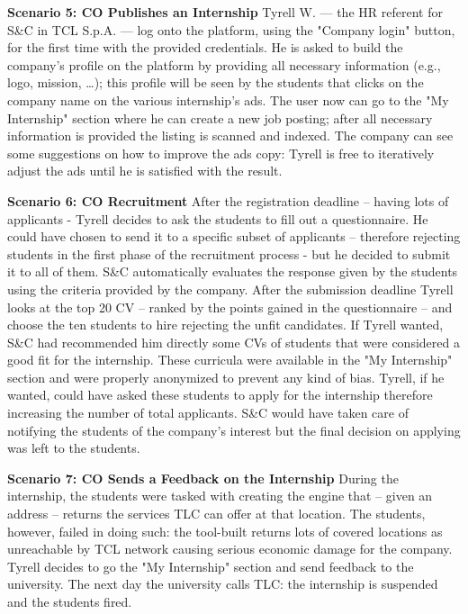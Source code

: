 \par{\textbf{Scenario 5: CO Publishes an Internship}} Tyrell W. — the HR referent for S\&C in TCL S.p.A. — log onto the
platform, using the "Company login" button, for the first time with the provided credentials. He is asked to build the
company’s profile on the platform by providing all necessary information (e.g., logo, mission, …); this profile will be
seen by the students that clicks on the company name on the various internship’s ads. The user now can go to the
"My Internship" section where he can create a new job posting; after all necessary information is provided the listing
is scanned and indexed. The company can see some suggestions on how to improve the ads copy: Tyrell is free to
iteratively adjust the ads until he is satisfied with the result.

\par{\textbf{Scenario 6: CO Recruitment}} After the registration deadline – having lots of applicants - Tyrell decides
to ask the students to fill out a questionnaire. He could have chosen to send it to a specific subset of applicants
– therefore rejecting students in the first phase of the recruitment process - but he decided to submit it to all of
them. S\&C automatically evaluates the response given by the students using the criteria provided by the company. After
the submission deadline Tyrell looks at the top 20 CV – ranked by the points gained in the questionnaire – and choose
the ten students to hire rejecting the unfit candidates. If Tyrell wanted, S\&C had recommended him directly some CVs
of students that were considered a good fit for the internship. These curricula were available in the "My Internship"
section and were properly anonymized to prevent any kind of bias. Tyrell, if he wanted, could have asked these students
to apply for the internship therefore increasing the number of total applicants. S\&C would have taken care of
notifying the students of the company's interest but the final decision on applying was left to the students.

\par{\textbf{Scenario 7: CO Sends a Feedback on the Internship}} During the internship, the students were tasked with
creating the engine that – given an address – returns the services TLC can offer at that location. The students,
however, failed in doing such: the tool-built returns lots of covered locations as unreachable by TCL network causing
serious economic damage for the company. Tyrell decides to go the "My Internship" section and send feedback to the
university. The next day the university calls TLC: the internship is suspended and the students fired.

